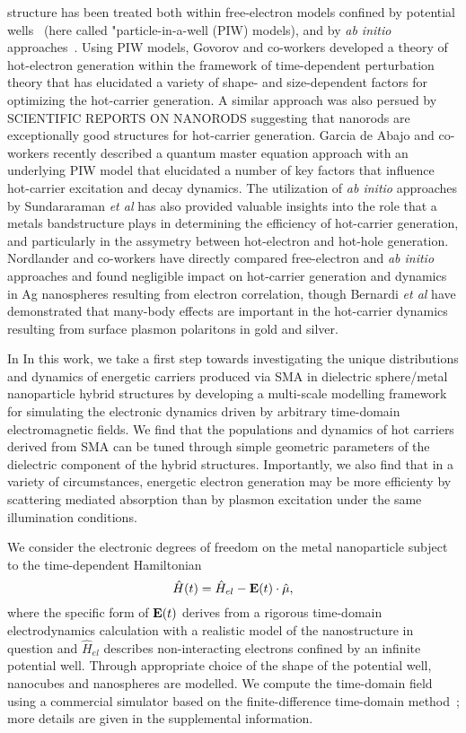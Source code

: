\documentclass[journal=jpclcd,manuscript=letter]{achemso}
\begin{document}
structure has been treated both within free-electron models confined by potential wells~\cite{all_the_PIW_papers} (here called
"particle-in-a-well (PIW) models), and by {\it ab initio} approaches~\cite{all_the_dft_papers}.
Using PIW models, Govorov and co-workers developed a theory of 
hot-electron generation within the framework of time-dependent perturbation theory that
has elucidated a variety of shape- and size-dependent factors for optimizing 
the hot-carrier generation.  A similar approach was also persued by SCIENTIFIC REPORTS ON NANORODS suggesting
that nanorods are exceptionally good structures for hot-carrier generation.  Garcia de Abajo and co-workers recently described a 
quantum master equation approach with an underlying PIW model that elucidated a number of key factors that influence
hot-carrier excitation and decay dynamics.  The utilization of {\it ab initio} approaches by Sundararaman {\it et al} 
has also provided valuable insights into the role that a metals bandstructure plays
in determining the efficiency of hot-carrier generation, and particularly in the assymetry between hot-electron
and hot-hole generation.  Nordlander and co-workers have directly compared free-electron and {\it ab initio} approaches
and found negligible impact on hot-carrier generation and dynamics in Ag nanospheres resulting from electron correlation, 
though Bernardi {\it et al} have demonstrated that many-body effects are important in the hot-carrier dynamics resulting
from surface plasmon polaritons in gold and silver.

In 
In this work, we take a first step towards investigating the unique distributions and dynamics of energetic carriers produced via SMA in 
dielectric sphere/metal nanoparticle hybrid structures by developing a multi-scale modelling framework
for simulating the electronic dynamics driven by arbitrary time-domain electromagnetic fields.  We find that the populations
and dynamics of hot carriers derived from SMA can be tuned through simple
geometric parameters of the dielectric component of the hybrid structures.   Importantly, we also find that in a variety of circumstances, energetic electron
generation may be more efficienty by scattering mediated absorption than by plasmon excitation under the same illumination conditions.

We consider the electronic degrees of freedom on the metal nanoparticle subject to the time-dependent Hamiltonian 
\begin{equation}\label{eq:TDHam}
\hat{H}(t) = \hat{H}_{el} - {\bf E}(t) \cdot \hat{\mu}, 
\end{equation}
where the specific form of ${\bf E}(t)$ derives from a rigorous time-domain electrodynamics calculation with a realistic model
of the nanostructure in question and $\hat{H}_{el}$ describes non-interacting electrons confined by an infinite potential well.  
Through appropriate choice of the shape of the potential well, nanocubes and nanospheres are modelled.  We compute the time-domain field 
using a commercial simulator based on the finite-difference time-domain method~\cite{Lumerical}; more details are given in 
the supplemental information.    
\end{document}

